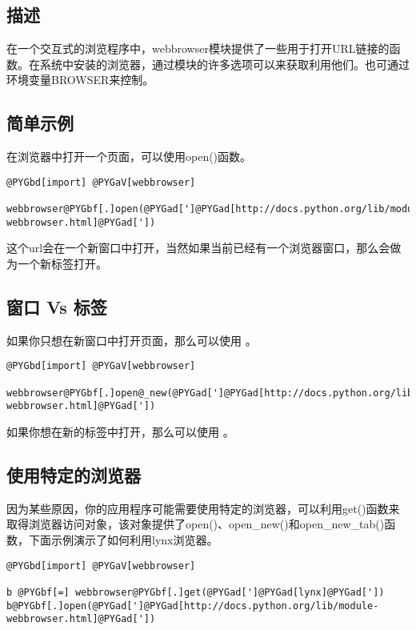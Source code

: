 \documentclass[letterpaper,10pt,english]{manual}
\begin{document}
\subsection{描述}

在一个交互式的浏览程序中，webbrowser模块提供了一些用于打开URL链接的函数。在系统中安装的浏览器，通过模块的许多选项可以来获取利用他们。也可通过环境变量BROWSER来控制。


\subsection{简单示例}

在浏览器中打开一个页面，可以使用open()函数。

\begin{Verbatim}[commandchars=@\[\]]
@PYGbd[import] @PYGaV[webbrowser]

webbrowser@PYGbf[.]open(@PYGad[']@PYGad[http://docs.python.org/lib/module-webbrowser.html]@PYGad['])
\end{Verbatim}

这个url会在一个新窗口中打开，当然如果当前已经有一个浏览器窗口，那么会做为一个新标签打开。


\subsection{窗口 Vs 标签}

如果你只想在新窗口中打开页面，那么可以使用  。

\begin{Verbatim}[commandchars=@\[\]]
@PYGbd[import] @PYGaV[webbrowser]

webbrowser@PYGbf[.]open@_new(@PYGad[']@PYGad[http://docs.python.org/lib/module-webbrowser.html]@PYGad['])
\end{Verbatim}

如果你想在新的标签中打开，那么可以使用  。


\subsection{使用特定的浏览器}

因为某些原因，你的应用程序可能需要使用特定的浏览器，可以利用get()函数来取得浏览器访问对象，该对象提供了open()、open\_new()和open\_new\_tab()函数，下面示例演示了如何利用lynx浏览器。

\begin{Verbatim}[commandchars=@\[\]]
@PYGbd[import] @PYGaV[webbrowser]

b @PYGbf[=] webbrowser@PYGbf[.]get(@PYGad[']@PYGad[lynx]@PYGad['])
b@PYGbf[.]open(@PYGad[']@PYGad[http://docs.python.org/lib/module-webbrowser.html]@PYGad['])
\end{Verbatim}
\end{document}
